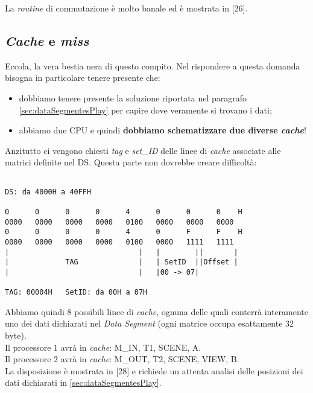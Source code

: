 La \textit{routine} di commutazione è molto banale ed è mostrata in [26].

\subsection{\textit{Cache} e \textit{miss}}

Eccola, la vera bestia nera di questo compito. Nel rispondere a questa domanda bisogna in particolare tenere presente che:
\begin{itemize}
\item dobbiamo tenere presente la soluzione riportata nel paragrafo  \ref{sec:dataSegmentesPlay} per capire dove veramente si trovano i dati;
\item abbiamo due CPU e quindi \textbf{dobbiamo schematizzare due diverse \textit{cache}}!
\end{itemize}

Anzitutto ci vengono chiesti \textit{tag} e \textit{set\_ID} delle linee di \textit{cache} associate alle matrici definite nel DS. Questa parte non dovrebbe creare difficoltà:

\begin{verbatim}

DS: da 4000H a 40FFH

0      0      0      0      4      0      0      0    H 
0000   0000   0000   0000   0100   0000   0000   0000
0      0      0      0      4      0      F      F    H 
0000   0000   0000   0000   0100   0000   1111   1111
|                              |   |        ||       |
|             TAG              |   | SetID  ||Offset |
|                              |   |00 -> 07|

TAG: 00004H   SetID: da 00H a 07H
\end{verbatim}

Abbiamo quindi 8 possibili linee di \textit{cache}, ognuna delle quali conterrà interamente uno dei dati dichiarati nel \textit{Data Segment} (ogni matrice occupa esattamente 32 byte). \\
Il processore 1 avrà in \textit{cache}: M\_IN, T1, SCENE, A. \\
Il processore 2 avrà in \textit{cache}: M\_OUT, T2, SCENE, VIEW, B. \\
La disposizione è mostrata in [28] e richiede un attenta analisi delle posizioni dei dati dichiarati in  \ref{sec:dataSegmentesPlay}.

